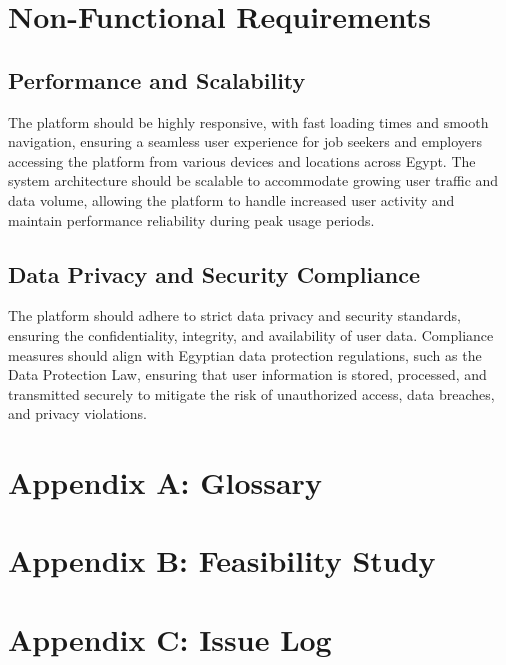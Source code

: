 \documentclass[titlepage]{article}
\begin{document}
\section{Non-Functional Requirements}
\subsection{Performance and Scalability}

The platform   should be highly responsive, with fast loading times and smooth navigation, ensuring a seamless user experience for job seekers and employers accessing the platform from various devices and locations across Egypt.
The system architecture should be scalable to accommodate growing user traffic and data volume, allowing the platform to handle increased user activity and maintain performance reliability during peak usage periods.
\subsection{Data Privacy and Security Compliance}

The platform should adhere to strict data privacy and security standards, ensuring the confidentiality, integrity, and availability of user data.
Compliance measures should align with Egyptian data protection regulations, such as the Data Protection Law, ensuring that user information is stored, processed, and transmitted securely to mitigate the risk of unauthorized access, data breaches, and privacy violations.
\appendix
\section{Appendix A: Glossary}
\section{Appendix B: Feasibility Study}
\section{Appendix C: Issue Log}
\end{document}

